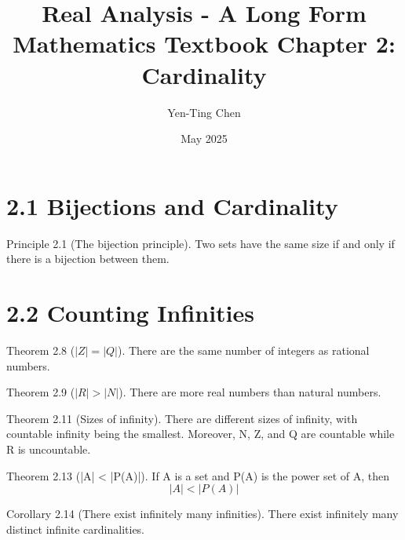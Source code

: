 \documentclass[12pt]{article}
\title{Real Analysis - A Long Form Mathematics Textbook Chapter 2: Cardinality}
\author{Yen-Ting Chen}
\date{May 2025}
\begin{document}
	\maketitle
	\section*{2.1 Bijections and Cardinality}
		Principle 2.1 (The bijection principle). Two sets have the same size if and only if there is a bijection between them.
		
	\section*{2.2 Counting Infinities}
		Theorem 2.8 ($|Z| = |Q|$). There are the same number of integers as rational numbers.
		
		Theorem 2.9 ($|R| > |N|$). There are more real numbers than natural numbers.
		
		Theorem 2.11 (Sizes of infinity). There are different sizes of infinity, with countable infinity being the smallest. Moreover, N, Z, and Q are countable while R is uncountable.
		
		Theorem 2.13 (|A| < |P(A)|). If A is a set and P(A) is the power set of A, then
		\begin{equation}
			|A| < |P(A)|
		\end{equation}
		
		Corollary 2.14 (There exist infinitely many infinities). There exist infinitely many distinct infinite cardinalities.
\end{document}
